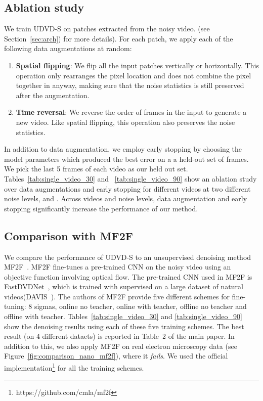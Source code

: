 \documentclass[final]{cvpr}
\begin{document}
\subsection{Ablation study}
\label{sec:augmentations}

We train UDVD-S on  patches extracted from the noisy video. (see Section~\ref{sec:arch}) for more details). For each patch, we apply each of the following data augmentations at random:
\begin{enumerate}
    \item \textbf{Spatial flipping}: We flip all the  input patches vertically or horizontally. This operation only rearranges the pixel location and does not combine the pixel together in anyway, making sure that the noise statistics is still preserved after the augmentation. 
    \item \textbf{Time reversal}: We reverse the order of frames in the input to generate a new video. Like spatial flipping, this operation also preserves the noise statistics. 
\end{enumerate}

In addition to data augmentation, we employ early stopping by choosing the model parameters which produced the best error on a a held-out set of frames. We pick the last 5 frames of each video as our held out set. Tables~\ref{tab:single_video_30} and ~\ref{tab:single_video_90} show an ablation study over data augmentations and early stopping for  different videos at two different noise levels,  and . Across videos and noise levels, data augmentation and early stopping significantly increase the performance of our method.  

\subsection{Comparison with MF2F}
\label{sec:mf2f}

We compare the performance of UDVD-S to an unsupervised denoising method MF2F~\cite{mf2f}. MF2F fine-tunes a pre-trained CNN on the noisy video using an objective function involving optical flow. The pre-trained CNN used in MF2F is FastDVDNet~\cite{fastdvdnet}, which is trained with supervised on a large dataset of natural videos(DAVIS~\cite{davis}). The authors of MF2F provide five different schemes for fine-tuning: 8 sigmas, online no teacher, online with teacher, offline no teacher and offline with teacher. Tables~\ref{tab:single_video_30} and \ref{tab:single_video_90} show the denoising results using each of these five training schemes. The best result (on 4 different dataets) is reported in Table~2 of the main paper. In addition to this, we also apply MF2F on real electron microscopy data (see Figure~\ref{fig:comparison_nano_mf2f}), where it \emph{fails}. We used the official implementation\footnote{https://github.com/cmla/mf2f} for all the training schemes.
\end{document}
